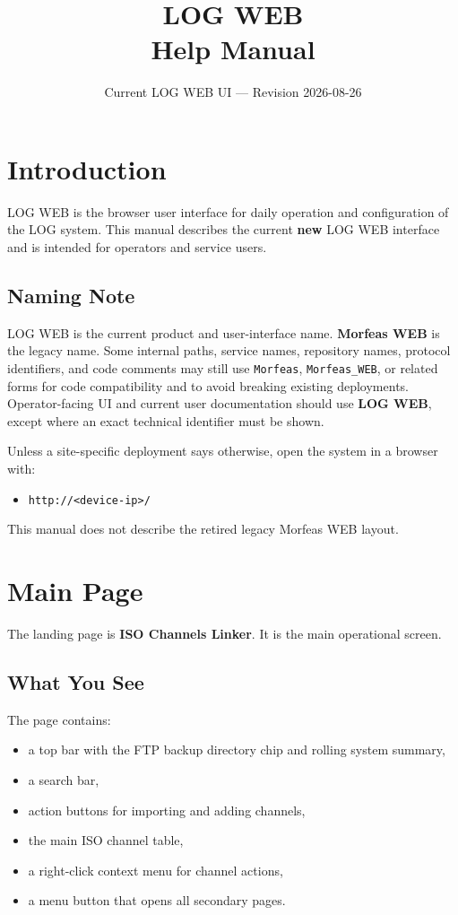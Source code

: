 \documentclass[11pt,a4paper]{article}
\title{LOG WEB\\Help Manual}
\author{}
\date{Current LOG WEB UI --- Revision 2026-08-26}
\begin{document}
\maketitle
\thispagestyle{empty}
\tableofcontents
\newpage

\section{Introduction}
LOG WEB is the browser user interface for daily operation and configuration of the LOG system.
This manual describes the current \textbf{new} LOG WEB interface and is intended for operators and service users.

\subsection{Naming Note}
LOG WEB is the current product and user-interface name. \textbf{Morfeas WEB} is the legacy name.
Some internal paths, service names, repository names, protocol identifiers, and code comments may still use \texttt{Morfeas}, \texttt{Morfeas\_WEB}, or related forms for code compatibility and to avoid breaking existing deployments.
Operator-facing UI and current user documentation should use \textbf{LOG WEB}, except where an exact technical identifier must be shown.

Unless a site-specific deployment says otherwise, open the system in a browser with:

\begin{itemize}
\item \texttt{http://<device-ip>/}
\end{itemize}

This manual does not describe the retired legacy Morfeas WEB layout.

\section{Main Page}
The landing page is \textbf{ISO Channels Linker}. It is the main operational screen.

\subsection{What You See}
The page contains:

\begin{itemize}
\item a top bar with the FTP backup directory chip and rolling system summary,
\item a search bar,
\item action buttons for importing and adding channels,
\item the main ISO channel table,
\item a right-click context menu for channel actions,
\item a menu button that opens all secondary pages.
\end{itemize}
\end{document}
